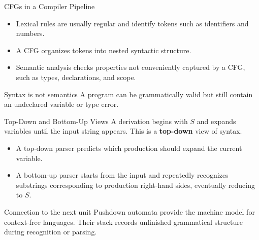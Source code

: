 \documentclass[10pt]{beamer}
\begin{document}
\begin{frame}{CFGs in a Compiler Pipeline}
  \begin{center}
  \end{center}
  \pause
  \begin{itemize}
    \item Lexical rules are usually regular and identify tokens such as identifiers and numbers.
    \item A CFG organizes tokens into nested syntactic structure.
    \item Semantic analysis checks properties not conveniently captured by a CFG, such as types,
      declarations, and scope.
  \end{itemize}
  \begin{alertblock}{Syntax is not semantics}
    A program can be grammatically valid but still contain an undeclared variable or type error.
  \end{alertblock}
\end{frame}

\begin{frame}{Top-Down and Bottom-Up Views}
  A derivation begins with $S$ and expands variables until the input string appears. This is a
  \textbf{top-down} view of syntax.
  \begin{itemize}
    \item A top-down parser predicts which production should expand the current variable.
    \item A bottom-up parser starts from the input and repeatedly recognizes substrings corresponding
      to production right-hand sides, eventually reducing to $S$.
  \end{itemize}
  \begin{block}{Connection to the next unit}
    Pushdown automata provide the machine model for context-free languages. Their stack records
    unfinished grammatical structure during recognition or parsing.
  \end{block}
\end{frame}
\end{document}

